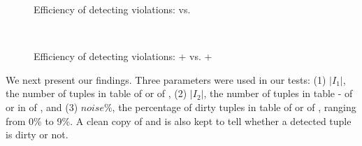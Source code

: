 \begin{figure}[tb!]
  \quad
  \quad
  \caption{Efficiency of detecting violations: \pCINDs vs. \CINDs}\label{fig_exp1_cindp}
\end{figure}

\begin{figure}[tb!]
  \centering
  \quad
  \quad
  \quad \\
  \quad
  \quad

  \caption{Efficiency of detecting violations: \pCFDs + \pCINDs vs. \CFDs + \CINDs}\label{fig_exp1_both}
\end{figure}

We next present our findings.
%
Three parameters were used in our tests:
(1) $|I_1|$, the number of tuples in table  of \hosp or  of \dblp,
(2) $|I_2|$, the number of tuples in table - of \hosp or in  of \dblp, and
(3) $noise\%$, the percentage of dirty tuples in table  of \hosp or   of \dblp, ranging from 0\% to 9\%.
A clean copy of \hosp and \dblp is also kept to tell whether a detected tuple is dirty or not.



